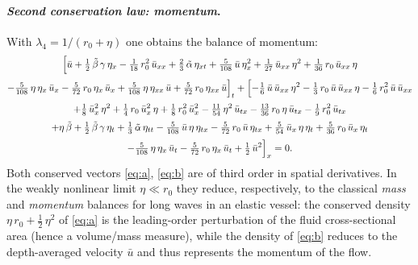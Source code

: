 \documentclass[alpha-refs, 12pt]{wiley-article}
\begin{document}
\paragraph{\textit{Second conservation law: momentum}.} With $\displaystyle\lambda_{4}=1/(r_{0}+\eta)$ one obtains the balance of momentum:
\begin{multline}\label{eq:b}
  \Bigl[
        \bar{u}
        +\tfrac12\,\tilde{\beta}\,\gamma\,\eta_{x}
        -\tfrac1{18}\,r_{0}^{2}\,\bar{u}_{xx}
        +\tfrac23\,\tilde{\alpha}\,\eta_{xt}
        +\tfrac{5}{108}\,\bar{u}\,\eta_{x}^{2}
        +\tfrac1{27}\,\bar{u}_{xx}\,\eta^{2}
        +\tfrac1{36}\,r_{0}\,\bar{u}_{xx}\,\eta
        \\[2pt]
        -\tfrac{5}{108}\,\eta\,\eta_{x}\,\bar{u}_{x}
        -\tfrac{5}{72}\,r_{0}\,\eta_{x}\,\bar{u}_{x}
        +\tfrac{5}{108}\,\eta\,\eta_{xx}\,\bar{u}
        +\tfrac{5}{72}\,r_{0}\,\eta_{xx}\,\bar{u}
  \Bigr]_{t}
  +\Bigl[
        -\tfrac16\,\bar{u}\,\bar{u}_{xx}\,\eta^{2}
        -\tfrac13\,r_{0}\,\bar{u}\,\bar{u}_{xx}\,\eta
        -\tfrac16\,r_{0}^{2}\,\bar{u}\,\bar{u}_{xx}
        \\[2pt]
        +\tfrac18\,\bar{u}_{x}^{2}\,\eta^{2}
        +\tfrac14\,r_{0}\,\bar{u}_{x}^{2}\,\eta
        +\tfrac18\,r_{0}^{2}\,\bar{u}_{x}^{2}
        -\tfrac{11}{54}\,\eta^{2}\,\bar{u}_{tx}
        -\tfrac{13}{36}\,r_{0}\,\eta\,\bar{u}_{tx}
        -\tfrac19\,r_{0}^{2}\,\bar{u}_{tx}
        \\[2pt]
        +\eta\,\tilde{\beta}
        +\tfrac12\,\tilde{\beta}\,\gamma\,\eta_{t}
        +\tfrac13\,\tilde{\alpha}\,\eta_{tt}
        -\tfrac{5}{108}\,\bar{u}\,\eta\,\eta_{tx}
        -\tfrac{5}{72}\,r_{0}\,\bar{u}\,\eta_{tx}
        +\tfrac{5}{54}\,\bar{u}_{x}\,\eta\,\eta_{t}
        +\tfrac{5}{36}\,r_{0}\,\bar{u}_{x}\,\eta_{t}
        \\[2pt]
        -\tfrac{5}{108}\,\eta\,\eta_{x}\,\bar{u}_{t}
        -\tfrac{5}{72}\,r_{0}\,\eta_{x}\,\bar{u}_{t}
        +\tfrac12\,\bar{u}^{2}
  \Bigr]_{x}=0.
\end{multline}
Both conserved vectors \eqref{eq:a}, \eqref{eq:b} are of third order in spatial derivatives. In the weakly nonlinear limit $\eta \ll r_{0}$ they reduce, respectively, to the classical \emph{mass} and \emph{momentum} balances for long waves in an elastic vessel: the conserved density $\eta\,r_{0}+\tfrac12\,\eta^{2}$ of \eqref{eq:a} is the leading-order perturbation of the fluid cross-sectional area (hence a volume/mass measure), while the density of \eqref{eq:b} reduces to the depth-averaged velocity $\bar{u}$ and thus represents the momentum of the flow.
\end{document}
